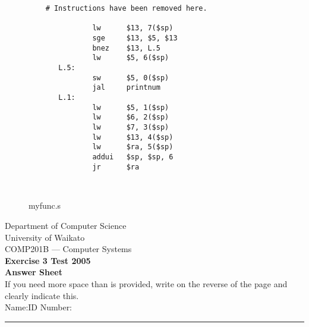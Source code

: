 \documentclass[a4paper,10pt]{article}
\begin{document}
\begin{enumerate}
\begin{figure}[ht]
{\begin{verbatim}
    # Instructions have been removed here.

               lw      $13, 7($sp)
               sge     $13, $5, $13
               bnez    $13, L.5
               lw      $5, 6($sp)
       L.5:
               sw      $5, 0($sp)
               jal     printnum
       L.1:
               lw      $5, 1($sp)
               lw      $6, 2($sp)
               lw      $7, 3($sp)
               lw      $13, 4($sp)
               lw      $ra, 5($sp)
               addui   $sp, $sp, 6
               jr      $ra

  
\end{verbatim}
}%
\caption{myfunc.s}
\label{fig:c_function_wramp_code}

\end{figure}


\end{enumerate}









\clearpage
\newpage
\newpage
\newpage
\setcounter{page}{1} 

\vspace*{-1cm} 

{\centering
\Large 
Department of Computer Science\\
University of Waikato\\[5mm]
COMP201B --- Computer Systems\\[5mm]
\bf Exercise 3 Test 2005\\
Answer Sheet\\[5mm]
}
If you need more space than is provided, write on the reverse of the
page and clearly indicate this.\\[5mm]
Name:\hspace*{5cm}ID Number:\\
\hrule
\end{document}
